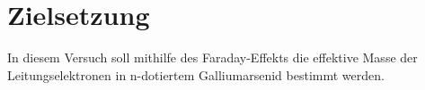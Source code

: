 \section{Zielsetzung}
In diesem Versuch soll mithilfe des Faraday-Effekts die effektive Masse der Leitungselektronen
in n-dotiertem Galliumarsenid bestimmt werden.

\label{sec:Zielsetzung}
